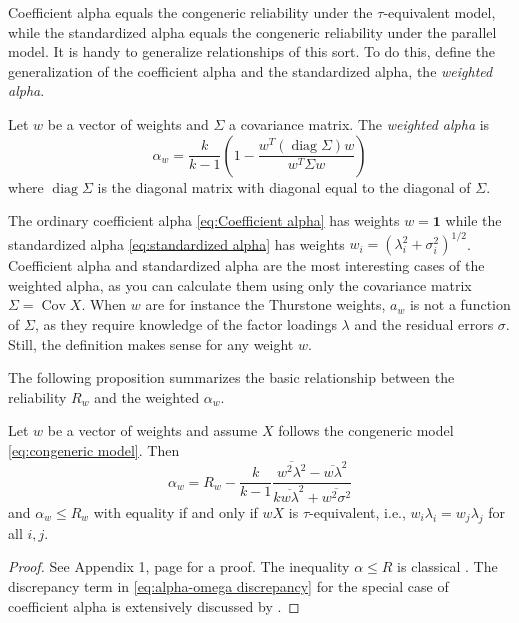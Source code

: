 \documentclass[twoside]{article}
\DeclareMathOperator{\Cov}{Cov}
\DeclareMathOperator{\diag}{diag}
\renewcommand{\sqrt}[1]{{(#1)^{1/2}}}
\begin{document}
Coefficient alpha equals the congeneric reliability under the $\tau$-equivalent model, while the standardized alpha equals the congeneric reliability under the parallel model. It is handy to generalize relationships of this sort. To do this, define the generalization of the coefficient alpha and the standardized alpha, the \textit{weighted alpha}.
\begin{defn}
Let $w$ be a vector of weights and $\Sigma$ a covariance matrix. The \textit{weighted alpha} is
\begin{equation}
\alpha_{w}=\frac{k}{k-1}\left(1-\frac{w^{T}(\diag\Sigma)w}{w^{T}\Sigma w}\right)\label{eq:weighted alpha}
\end{equation}
where $\diag\Sigma$ is the diagonal matrix with diagonal equal to the diagonal of $\Sigma$.
\end{defn}
The ordinary coefficient alpha \eqref{eq:Coefficient alpha} has weights $w=\boldsymbol{1}$
while the standardized alpha \eqref{eq:standardized alpha} has weights $w_{i}=\sqrt{\lambda_{i}^{2}+\sigma_{i}^{2}}$. Coefficient alpha and standardized alpha are the most interesting cases of the weighted alpha, as you can calculate them using only the covariance matrix $\Sigma = \Cov X$. When $w$ are for instance the Thurstone weights, $a_w$ is not a function of $\Sigma$, as they require knowledge of the factor loadings $\lambda$ and the residual errors $\sigma$. Still, the definition makes sense for any weight $w$. 

The following proposition summarizes the basic relationship
between the reliability $ R_{w}$ and the weighted $\alpha_{w}$.
\begin{prop}
\label{prop:weighted alpha}Let $w$ be a vector of weights and
assume $X$ follows the congeneric model \eqref{eq:congeneric model}. Then 
\begin{equation}
\alpha_{w}= R_{w}-\frac{k}{k-1}\frac{\overline{w^{2}\lambda^{2}}-\overline{w\lambda}^{2}}{k\overline{w\lambda}^{2}+\overline{w^{2}\sigma^{2}}}\label{eq:alpha-omega discrepancy}
\end{equation}
and $\alpha_w \leq  R_w$ with equality if and only if $wX$ is $\tau$-equivalent, i.e., $w_i\lambda_{i}=w_j\lambda_{j}$
for all $i,j$.
\end{prop}
\begin{proof}
See Appendix 1, page \pageref{proof:weighted alpha}
for a proof. The inequality $\alpha\leq R$ is classical \citep[][Theorem 4.4.3]{Lord1968-ax}. The discrepancy term in \eqref{eq:alpha-omega discrepancy} for the special case of coefficient alpha is extensively discussed by \citet{Raykov1997-bu}. 
\end{proof}
\end{document}
